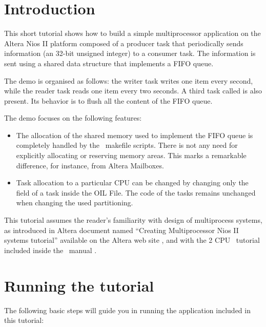 \chapter{Introduction}

This short tutorial shows how to build a simple multiprocessor
application on the Altera Nios II platform composed of a producer
 task that periodically sends information (an
 32-bit unsigned integer) to a consumer
 task. The information is sent using a shared data
structure that implements a FIFO queue.

The demo is organised as follows: the writer task 
writes one item every second, while the reader task 
reads one item every two seconds. A third task called
 is also present. Its behavior is to flush all
the content of the FIFO queue.

The demo focuses on the following features:
\begin{itemize}
\item The allocation of the shared memory used to implement the FIFO
  queue is completely handled by the \ee\ makefile scripts. There is
  not any need for explicitly allocating or reserving memory
  areas. This marks a remarkable difference, for instance, from Altera
  Mailboxes.
\item Task allocation to a particular CPU can be changed by changing
  only the  field of a task inside the OIL File. The
  code of the tasks remains unchanged when changing the used
  partitioning.
\end{itemize}

This tutorial assumes the reader's familiarity with design of
multiprocess systems, as introduced in Altera document named
{}``Creating Multiprocessor Nios II systems tutorial'' available on
the Altera web site \cite{Altera-multicpu-tutorial}, and with the 2
CPU \ee\ tutorial included inside the \ee\ manual
\cite{Evidence-multicpu-tutorial}.

\chapter{Running the tutorial}

The following basic steps will guide you in running the application
included in this tutorial:

